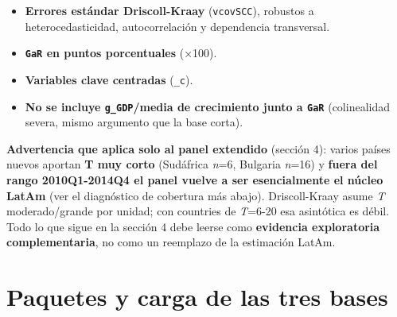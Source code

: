 \documentclass[
]{article}
\providecommand{\tightlist}{%
  \setlength{\itemsep}{0pt}\setlength{\parskip}{0pt}}
\begin{document}
\begin{itemize}
\tightlist
\item
  \textbf{Errores estándar Driscoll-Kraay} (\texttt{vcovSCC}), robustos
  a heterocedasticidad, autocorrelación y dependencia transversal.
\item
  \textbf{\texttt{GaR} en puntos porcentuales} (×100).
\item
  \textbf{Variables clave centradas} (\texttt{\_c}).
\item
  \textbf{No se incluye \texttt{g\_GDP}/media de crecimiento junto a
  \texttt{GaR}} (colinealidad severa, mismo argumento que la base
  corta).
\end{itemize}

\textbf{Advertencia que aplica solo al panel extendido} (sección 4):
varios países nuevos aportan \textbf{T muy corto} (Sudáfrica \emph{n}=6,
Bulgaria \emph{n}=16) y \textbf{fuera del rango 2010Q1-2014Q4 el panel
vuelve a ser esencialmente el núcleo LatAm} (ver el diagnóstico de
cobertura más abajo). Driscoll-Kraay asume \emph{T} moderado/grande por
unidad; con countries de \emph{T}=6-20 esa asintótica es débil. Todo lo
que sigue en la sección 4 debe leerse como \textbf{evidencia
exploratoria complementaria}, no como un reemplazo de la estimación
LatAm.

\section{Paquetes y carga de las tres
bases}\label{paquetes-y-carga-de-las-tres-bases}
\end{document}
